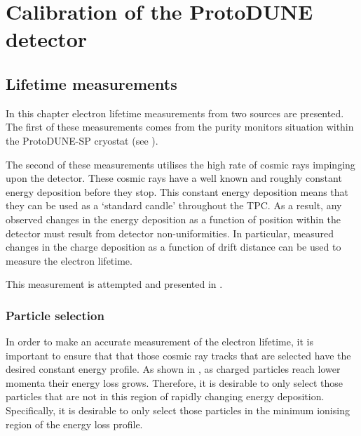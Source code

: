 \chapter{Calibration of the ProtoDUNE detector}
\label{sec:pdune_calibration}

\section{Lifetime measurements}
\label{sec:pdune_calibration:lifetime}

In this chapter electron lifetime measurements from two sources are presented.
The first of these measurements comes from the purity monitors situation within the ProtoDUNE-SP cryostat (see ).

The second of these measurements utilises the high rate of cosmic rays impinging upon the detector.
These cosmic rays have a well known and roughly constant energy deposition before they stop.
This constant energy deposition means that they can be used as a `standard candle' throughout the TPC.
As a result, any observed changes in the energy deposition as a function of position within the detector must result from detector non-uniformities.
In particular, measured changes in the charge deposition as a function of drift distance can be used to measure the electron lifetime.

This measurement is attempted and presented in .

\subsection{Particle selection}
\label{sec:pdune_calibration:lifetime:selection}

In order to make an accurate measurement of the electron lifetime, it is important to ensure that that those cosmic ray tracks that are selected have the desired constant energy profile.
As shown in , as charged particles reach lower momenta their energy loss grows.
Therefore, it is desirable to only select those particles that are not in this region of rapidly changing energy deposition.
Specifically, it is desirable to only select those particles in the minimum ionising region of the energy loss profile.

